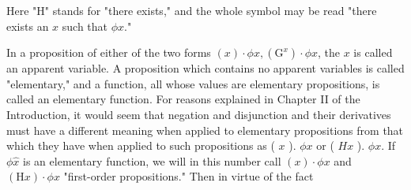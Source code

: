 \documentclass[10pt]{article}
\begin{document}
Here "H" stands for "there exists," and the whole symbol may be read "there exists an $x$ such that $\phi x$."

In a proposition of either of the two forms $(x) \cdot \phi x,\left(\mathrm{G}^{x}\right) \cdot \phi x$, the $x$ is called an apparent variable. A proposition which contains no apparent variables is called "elementary," and a function, all whose values are elementary propositions, is called an elementary function. For reasons explained in Chapter II of the Introduction, it would seem that negation and disjunction and their derivatives must have a different meaning when applied to elementary propositions from that which they have when applied to such propositions as ( $x$ ). $\phi x$ or ( $H x$ ). $\phi x$. If $\phi \hat{x}$ is an elementary function, we will in this number call $(x) \cdot \phi x$ and $(\mathrm{H} x) \cdot \phi x$ "first-order propositions." Then in virtue of the fact
\end{document}
